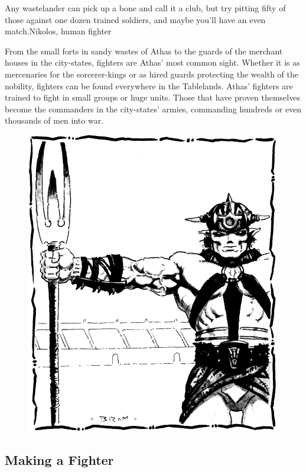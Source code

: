 {Any wastelander can pick up a bone and call it a club, but try pitting fifty of those against one dozen trained soldiers, and maybe you'll have an even match.}{Nikolos, human fighter}

From the small forts in sandy wastes of Athas to the guards of the merchant houses in the city-states, fighters are Athas' most common sight. Whether it is as mercenaries for the sorcerer-kings or as hired guards protecting the wealth of the nobility, fighters can be found everywhere in the Tablelands. Athas' fighters are trained to fight in small groups or huge units. Those that have proven themselves become the commanders in the city-states' armies, commanding hundreds or even thousands of men into war.

\begin{figure}[b!]
\centering
\includegraphics[width=\columnwidth]{images/gladiator-1.png}
\end{figure}

\subsection{Making a Fighter}

